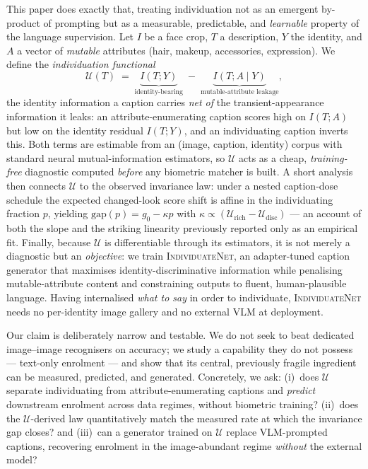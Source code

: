 \documentclass[10pt,twocolumn,letterpaper]{article}
\newcommand{\U}{\mathcal{U}}
\newcommand{\method}{\textsc{IndividuateNet}}
\begin{document}
This paper does exactly that, treating individuation not as an emergent by-product of prompting
but as a measurable, predictable, and \emph{learnable} property of the language supervision. Let
$I$ be a face crop, $T$ a description, $Y$ the identity, and $A$ a vector of \emph{mutable}
attributes (hair, makeup, accessories, expression). We define the \emph{individuation functional}
\begin{equation}
  \U(T) \;=\; \underbrace{I(T;Y)}_{\text{identity-bearing}} \;-\;
              \underbrace{I(T;A\mid Y)}_{\text{mutable-attribute leakage}},
  \label{eq:U}
\end{equation}
the identity information a caption carries \emph{net of} the transient-appearance information it
leaks: an attribute-enumerating caption scores high on $I(T;A)$ but low on the identity residual
$I(T;Y)$, and an individuating caption inverts this. Both terms are estimable from an
(image, caption, identity) corpus with standard neural mutual-information estimators, so $\U$
acts as a cheap, \emph{training-free} diagnostic computed \emph{before} any biometric matcher is
built. A short analysis then connects $\U$ to the observed invariance law: under a nested
caption-dose schedule the expected changed-look score shift is affine in the individuating
fraction $p$, yielding $\mathrm{gap}(p)=g_0-\kappa p$ with
$\kappa\propto(\U_{\text{rich}}-\U_{\text{disc}})$ --- an account of both the slope and the
striking linearity previously reported only as an empirical fit. Finally, because $\U$ is
differentiable through its estimators, it is not merely a diagnostic but an \emph{objective}: we
train \method, an adapter-tuned caption generator that maximises identity-discriminative
information while penalising mutable-attribute content and constraining outputs to fluent,
human-plausible language. Having internalised \emph{what to say} in order to individuate,
\method{} needs no per-identity image gallery and no external VLM at deployment.

Our claim is deliberately narrow and testable. We do not seek to beat dedicated image--image
recognisers on accuracy; we study a capability they do not possess --- text-only enrolment ---
and show that its central, previously fragile ingredient can be measured, predicted, and
generated. Concretely, we ask: (i)~does $\U$ separate individuating from attribute-enumerating
captions and \emph{predict} downstream enrolment across data regimes, without biometric training?
(ii)~does the $\U$-derived law quantitatively match the measured rate at which the invariance gap
closes? and (iii)~can a generator trained on $\U$ replace VLM-prompted captions, recovering
enrolment in the image-abundant regime \emph{without} the external model?
\end{document}
